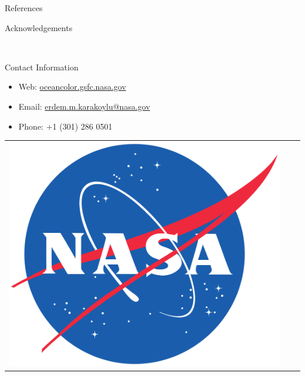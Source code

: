 \documentclass[final]{beamer}
\newlength{\onecolwid}
\begin{document}
\begin{frame}[t]
\begin{columns}[t]
\begin{column}{\onecolwid}
\begin{block}{References}
\nocite{} %
\small{
\vspace{0.75in}}

\end{block}



\begin{block}{Acknowledgements}

\small{} \\

\end{block}



\begin{alertblock}{Contact Information}

\begin{itemize}
\item Web: \href{oceancolor.gsfc.nasa.gov}{oceancolor.gsfc.nasa.gov}
\item Email: \href{mailto:erdem.m.karakoylu@nasa.gov}{erdem.m.karakoylu@nasa.gov}
\item Phone: +1 (301) 286 0501
\end{itemize}

\end{alertblock}

\begin{center}
\begin{tabular}{ccc}
\includegraphics[width=0.4\linewidth]{NASA_logo.png} & \hfill 
\end{tabular}
\end{center}


\end{column}
\end{columns}
\end{frame}
\end{document}
